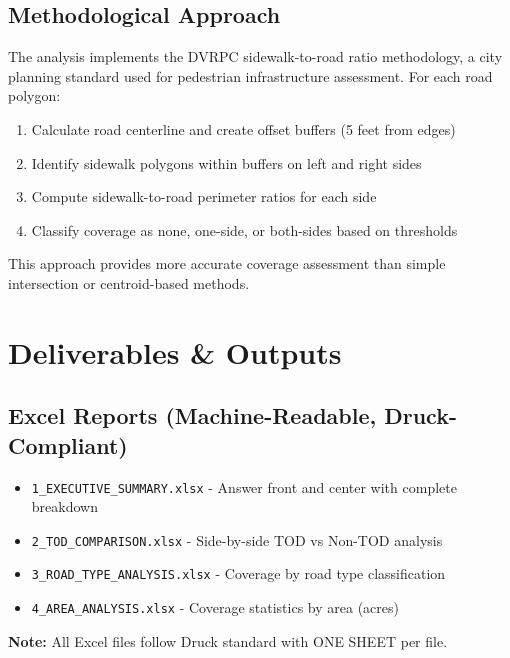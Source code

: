 \documentclass[11pt,letterpaper]{article}
\begin{document}
\subsection{Methodological Approach}
The analysis implements the DVRPC sidewalk-to-road ratio methodology, a city planning standard used for pedestrian infrastructure assessment. For each road polygon:
\begin{enumerate}
    \item Calculate road centerline and create offset buffers (5 feet from edges)
    \item Identify sidewalk polygons within buffers on left and right sides
    \item Compute sidewalk-to-road perimeter ratios for each side
    \item Classify coverage as none, one-side, or both-sides based on thresholds
\end{enumerate}

This approach provides more accurate coverage assessment than simple intersection or centroid-based methods.

\section{Deliverables \& Outputs}

\subsection{Excel Reports (Machine-Readable, Druck-Compliant)}
\begin{itemize}
    \item \texttt{1\_EXECUTIVE\_SUMMARY.xlsx} - Answer front and center with complete breakdown
    \item \texttt{2\_TOD\_COMPARISON.xlsx} - Side-by-side TOD vs Non-TOD analysis
    \item \texttt{3\_ROAD\_TYPE\_ANALYSIS.xlsx} - Coverage by road type classification
    \item \texttt{4\_AREA\_ANALYSIS.xlsx} - Coverage statistics by area (acres)
\end{itemize}

\textbf{Note:} All Excel files follow Druck standard with ONE SHEET per file.
\end{document}
